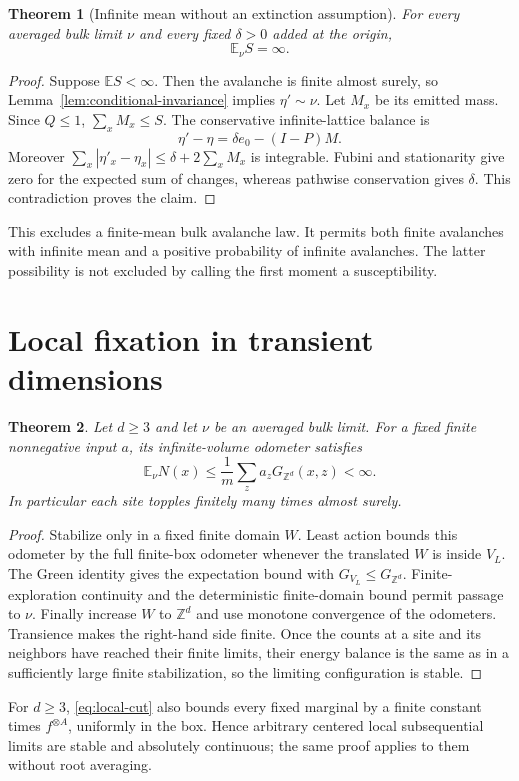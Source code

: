 \documentclass[11pt]{article}
\numberwithin{equation}{section}
\newtheorem{theorem}{Theorem}[section]
\theoremstyle{definition}
\newcommand{\E}{\mathbb E}
\newcommand{\Z}{\mathbb Z}
\begin{document}
\begin{theorem}[Infinite mean without an extinction assumption]\label{thm:infinite-mean}
For every averaged bulk limit $\nu$ and every fixed $\delta>0$ added at the origin,
\begin{equation}\label{eq:infinite-mean}
 \E_\nu S=\infty.
\end{equation}
\end{theorem}
\begin{proof}
Suppose $\E S<\infty$. Then the avalanche is finite almost surely, so Lemma~\ref{lem:conditional-invariance} implies $\eta'\sim\nu$. Let $M_x$ be its emitted mass. Since $Q\le1$, $\sum_xM_x\le S$. The conservative infinite-lattice balance is
\[
 \eta'-\eta=\delta e_0-(I-P)M.
\]
Moreover $\sum_x|\eta'_x-\eta_x|\le\delta+2\sum_xM_x$ is integrable. Fubini and stationarity give zero for the expected sum of changes, whereas pathwise conservation gives $\delta$. This contradiction proves the claim.
\end{proof}
This excludes a finite-mean bulk avalanche law. It permits both finite avalanches with infinite mean and a positive probability of infinite avalanches. The latter possibility is not excluded by calling the first moment a susceptibility.

\section{Local fixation in transient dimensions}\label{sec:transient}

\begin{theorem}\label{thm:local-fixation}
Let $d\ge3$ and let $\nu$ be an averaged bulk limit. For a fixed finite nonnegative input $a$, its infinite-volume odometer satisfies
\begin{equation}\label{eq:local-fixation}
 \E_\nu N(x)\le\frac1m\sum_z a_zG_{\Z^d}(x,z)<\infty.
\end{equation}
In particular each site topples finitely many times almost surely.
\end{theorem}
\begin{proof}
Stabilize only in a fixed finite domain $W$. Least action bounds this odometer by the full finite-box odometer whenever the translated $W$ is inside $V_L$. The Green identity gives the expectation bound with $G_{V_L}\le G_{\Z^d}$. Finite-exploration continuity and the deterministic finite-domain bound permit passage to $\nu$. Finally increase $W$ to $\Z^d$ and use monotone convergence of the odometers. Transience makes the right-hand side finite. Once the counts at a site and its neighbors have reached their finite limits, their energy balance is the same as in a sufficiently large finite stabilization, so the limiting configuration is stable.
\end{proof}
For $d\ge3$, \eqref{eq:local-cut} also bounds every fixed marginal by a finite constant times $f^{\otimes A}$, uniformly in the box. Hence arbitrary centered local subsequential limits are stable and absolutely continuous; the same proof applies to them without root averaging.
\end{document}
